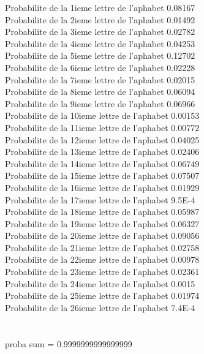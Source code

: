 \documentclass{article}
\begin{document}
{Probabilite de la 1ieme lettre de l'aphabet 0.08167\\
Probabilite de la 2ieme lettre de l'aphabet 0.01492\\
Probabilite de la 3ieme lettre de l'aphabet 0.02782\\
Probabilite de la 4ieme lettre de l'aphabet 0.04253\\
Probabilite de la 5ieme lettre de l'aphabet 0.12702\\
Probabilite de la 6ieme lettre de l'aphabet 0.02228\\
Probabilite de la 7ieme lettre de l'aphabet 0.02015\\
Probabilite de la 8ieme lettre de l'aphabet 0.06094\\
Probabilite de la 9ieme lettre de l'aphabet 0.06966\\
Probabilite de la 10ieme lettre de l'aphabet 0.00153\\
Probabilite de la 11ieme lettre de l'aphabet 0.00772\\
Probabilite de la 12ieme lettre de l'aphabet 0.04025\\
Probabilite de la 13ieme lettre de l'aphabet 0.02406\\
Probabilite de la 14ieme lettre de l'aphabet 0.06749\\
Probabilite de la 15ieme lettre de l'aphabet 0.07507\\
Probabilite de la 16ieme lettre de l'aphabet 0.01929\\
Probabilite de la 17ieme lettre de l'aphabet 9.5E-4\\
Probabilite de la 18ieme lettre de l'aphabet 0.05987\\
Probabilite de la 19ieme lettre de l'aphabet 0.06327\\
Probabilite de la 20ieme lettre de l'aphabet 0.09056\\
Probabilite de la 21ieme lettre de l'aphabet 0.02758\\
Probabilite de la 22ieme lettre de l'aphabet 0.00978\\
Probabilite de la 23ieme lettre de l'aphabet 0.02361\\
Probabilite de la 24ieme lettre de l'aphabet 0.0015\\
Probabilite de la 25ieme lettre de l'aphabet 0.01974\\
Probabilite de la 26ieme lettre de l'aphabet 7.4E-4\\
\\
\\
proba sum = 0.9999999999999999\\
}
\end{document}
